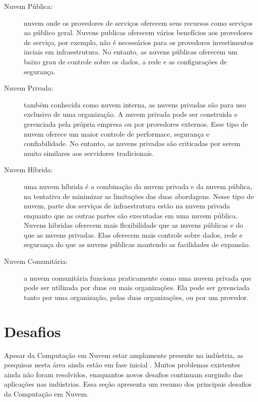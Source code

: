 	\begin{description}
	
		\item[Nuvem Pública:] nuvem onde os provedores de serviços oferecem seus recursos como serviços ao público geral. Nuvens publicas oferecem vários benefícios aos provedores de serviço, por exemplo, não é necessários para os provedores investimentos inciais em infraestrutura. No entanto, as nuvens públicas oferecem um baixo grau de controle sobre os dados, a rede e as configurações de segurança.  	 
			
		\item[Nuvem Privada:] também conhecida como nuvem interna, as nuvens privadas são para uso exclusivo de uma organização. A nuvem privada pode ser construida e gerenciada pela própria empresa ou por provedores externos. Esse tipo de nuvem oferece um maior controle de performace, segurança e confiabilidade. No entanto, as nuvens privadas são criticadas por serem muito similares aos servidores tradicionais.
		
		\item[Nuvem Híbrida:] uma nuvem híbrida é a combinação da nuvem privada e da nuvem pública, na tentativa de minimizar as limitações das duas abordagens. Nesse tipo de nuvem, parte dos serviços de infraestrutura estão na nuvem privada enquanto que as outras partes são executadas em uma nuvem pública. Nuvens hibridas oferecem mais flexibilidade que as nuvens públicas e do que as nuvens privadas. Elas oferecem mais controle sobre dados, rede e segurança do que as nuvens públicas mantendo as facilidades de expansão.
		
		\item[Nuvem Comunitária:] a nuvem comunitária funciona praticamente como uma nuvem privada que pode ser utilizada por duas ou mais organizações. Ela pode ser gerenciada tanto por uma organização, pelas duas organizações, ou por um provedor.
		 	
	\end{description}
	
\section{Desafios}

	Apesar da Computação em Nuvem estar amplamente presente na indústria, as pesquisas nesta área ainda estão em fase inicial \cite{stateOfArt:2010}.  Muitos problemas existentes ainda não foram resolvidos, enaquantos novos desafios continuam surgindo das aplicações nas indústrias. Essa seção apresenta um resumo dos principais desafios da Computação em Nuvem. 
	
